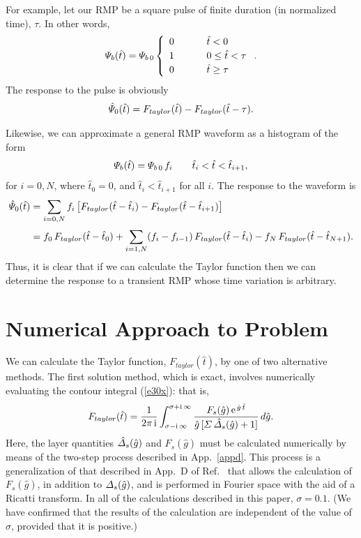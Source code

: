 \documentclass[12pt,prb,aps]{revtex4-1}
\begin{document}
For example, let our RMP be a square pulse of finite duration (in normalized time), $\tau$. In other words,
\begin{equation}\label{e145}
{\mit\Psi}_b(\hat{t}) = {\mit\Psi}_{b\,0}\left\{\begin{array}{ccl} 0&~~~~&\hat{t}<0\\[0.5ex]
1&&0 \leq \hat{t} <\tau\\[0.5ex]
0&&\hat{t}\geq \tau\end{array}\right..
\end{equation}
The response to the pulse is obviously
\begin{equation}
\hat{\mit\Psi}_0(\hat{t}) =F_{taylor}(\hat{t})- F_{taylor}(\hat{t}-\tau).
\end{equation}

Likewise, we can approximate a general RMP waveform as a histogram of the form 
\begin{equation}
{\mit\Psi}_b(\hat{t}) = {\mit\Psi}_{b\,0}\,f_i~~~~~~\hat{t}_i<\hat{t}<\hat{t}_{i+1},
\end{equation}
for $i=0,N$, where $\hat{t}_0=0$, and $\hat{t}_i<\hat{t}_{i+1}$ for all $i$. The response to the waveform is 
\begin{align}
\hat{\mit\Psi}_0(\hat{t})&=\sum_{i=0,N}f_i\left[F_{taylor}(\hat{t}-\hat{t}_i)- F_{taylor}(\hat{t}-\hat{t}_{i+1})\right]\nonumber\\[0.5ex]
&= f_0\,F_{taylor}(\hat{t}-\hat{t}_0) + \sum_{i=1,N}(f_i-f_{i-1})\,F_{taylor}(\hat{t}-\hat{t}_i) - f_N\,F_{taylor}(\hat{t}-\hat{t}_{N+1}). 
\end{align}
Thus, it is clear that if we can calculate the Taylor function then we can determine the response to a transient RMP whose time variation is arbitrary. 

\section{Numerical Approach to Problem}\label{full}
We can calculate the Taylor function, $F_{taylor}(\hat{t})$, by one of two alternative  methods.  The first solution  method,
which is exact,  involves numerically 
evaluating the contour integral (\ref{e30x}): that is, 
\begin{equation}\label{brom}
F_{taylor}(\hat{t})= \frac{1}{2\pi\,{\rm i}}\int_{\sigma-{\rm i}\,\infty}^{\sigma+{\rm i}\,\infty}\frac{F_s(\hat{g})\,{\rm e}^{\,\hat{g}\,\hat{t}}}{\hat{g}\,[{\mit\Sigma}\,\hat{\mit\Delta}_s(\hat{g})+1]}\,d\hat{g}.
\end{equation}
Here, the layer quantities $\hat{\mit\Delta}_s(\hat{g})$ and $F_s(\hat{g})$ must be calculated numerically by means of the two-step process described in App.~\ref{appd}. 
This process is a generalization of that described in App.~D of Ref.~ that allows the calculation of $F_s(\hat{g})$, in addition to ${\mit\Delta}_s(\hat{g})$, and
is performed in Fourier space with the aid of a Ricatti transform.\cite{park}
In all of the calculations described in this paper, 
 $\sigma = 0.1$. (We have confirmed that the results of the calculation  are independent of the value of $\sigma$, provided that it is positive.) 
\end{document}
